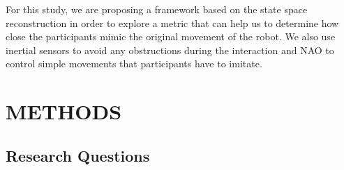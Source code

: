 \documentclass{sig-alternate-05-2015}
\begin{document}
For this study, we are proposing a framework based on the state space reconstruction 
in order to explore a metric that can help us to determine 
how close the participants mimic the original movement of the robot.
We also use inertial sensors to avoid any obstructions during the interaction 
and NAO to control simple movements that participants have to imitate.












% 
% 
% 







\section{METHODS}

\subsection{Research Questions}
\end{document}

